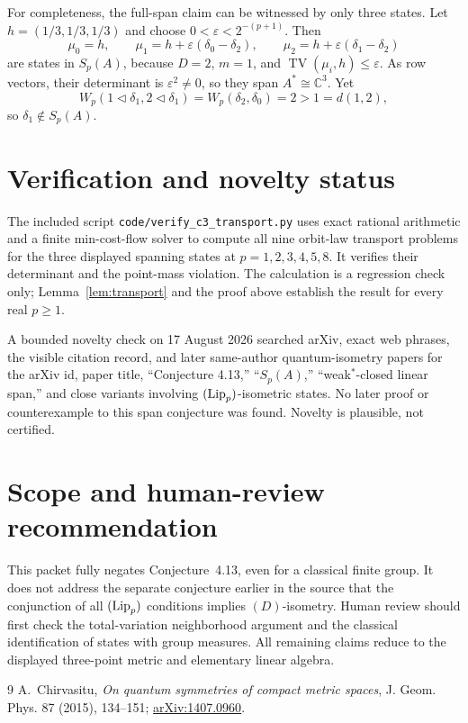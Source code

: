 \documentclass[11pt]{article}
\newcommand{\TV}{\operatorname{TV}}
\newcommand{\C}{\mathbb C}
\begin{document}
For completeness, the full-span claim can be witnessed by only three states.
Let $h=(1/3,1/3,1/3)$ and choose
$0<\varepsilon<2^{-(p+1)}$.  Then
\[
 \mu_0=h,\qquad
 \mu_1=h+\varepsilon(\delta_0-\delta_2),\qquad
 \mu_2=h+\varepsilon(\delta_1-\delta_2)
\]
are states in $S_p(A)$, because $D=2$, $m=1$, and
$\TV(\mu_i,h)\leq\varepsilon$.  As row vectors, their determinant is
$\varepsilon^2\ne0$, so they span $A^*\cong\C^3$.  Yet
\[
 W_p(1\mathbin{\triangleleft}\delta_1,
       2\mathbin{\triangleleft}\delta_1)
 =W_p(\delta_2,\delta_0)=2>1=d(1,2),
\]
so $\delta_1\notin S_p(A)$.

\section{Verification and novelty status}

The included script \texttt{code/verify\_c3\_transport.py} uses exact rational
arithmetic and a finite min-cost-flow solver to compute all nine orbit-law
transport problems for the three displayed spanning states at
$p=1,2,3,4,5,8$.  It verifies their determinant and the point-mass violation.
The calculation is a regression check only; Lemma~\ref{lem:transport} and the
proof above establish the result for every real $p\geq1$.

A bounded novelty check on 17 August 2026 searched arXiv, exact web phrases,
the visible citation record, and later same-author quantum-isometry papers for
the arXiv id, paper title, ``Conjecture 4.13,'' ``$S_p(A)$,''
``weak$^*$-closed linear span,'' and close variants involving
$({\rm Lip}_p)$-isometric states.  No later proof or counterexample to this
span conjecture was found.  Novelty is plausible, not certified.

\section{Scope and human-review recommendation}

This packet fully negates Conjecture~4.13, even for a classical finite group.
It does not address the separate conjecture earlier in the source that the
conjunction of all $({\rm Lip}_p)$ conditions implies $(D)$-isometry.
Human review should first check the total-variation neighborhood argument and
the classical identification of states with group measures.  All remaining
claims reduce to the displayed three-point metric and elementary linear
algebra.

\begin{thebibliography}{9}
A.~Chirvasitu,
\emph{On quantum symmetries of compact metric spaces},
J. Geom. Phys. 87 (2015), 134--151;
\href{https://arxiv.org/abs/1407.0960}{arXiv:1407.0960}.
\end{thebibliography}
\end{document}
